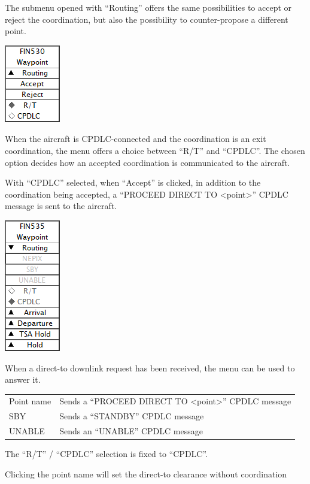 \documentclass[11pt,a4paper]{memoir}
\newenvironment{Warn}
  {\begin{shaded}\marginnote{\fbox{Warning}}}
  {\end{shaded}}
\begin{document}
The submenu opened with “Routing” offers the same possibilities to accept or reject the
coordination, but also the possibility to counter-propose a different point.

\includegraphics{img/wptdl.png}

When the aircraft is CPDLC-connected and the coordination is an exit coordination, the
menu offers a choice between “R/T” and “CPDLC”. The chosen option decides how an
accepted coordination is communicated to the aircraft.

With “CPDLC” selected, when “Accept” is clicked, in addition to the coordination being
accepted, a “PROCEED DIRECT TO <point>” CPDLC message is sent to the aircraft.

\includegraphics{img/wptroute.png}

When a direct-to downlink request has been received, the menu can be used to answer it.

\begin{tabular}{l l}
Point name  & Sends a “PROCEED DIRECT TO <point>” CPDLC message
\\SBY         & Sends a “STANDBY” CPDLC message
\\UNABLE      & Sends an “UNABLE” CPDLC message
\end{tabular}   

The “R/T” / “CPDLC” selection is fixed to “CPDLC”.

\begin{Warn}
Clicking the point name will set the direct-to clearance without coordination
\end{Warn}
\end{document}
